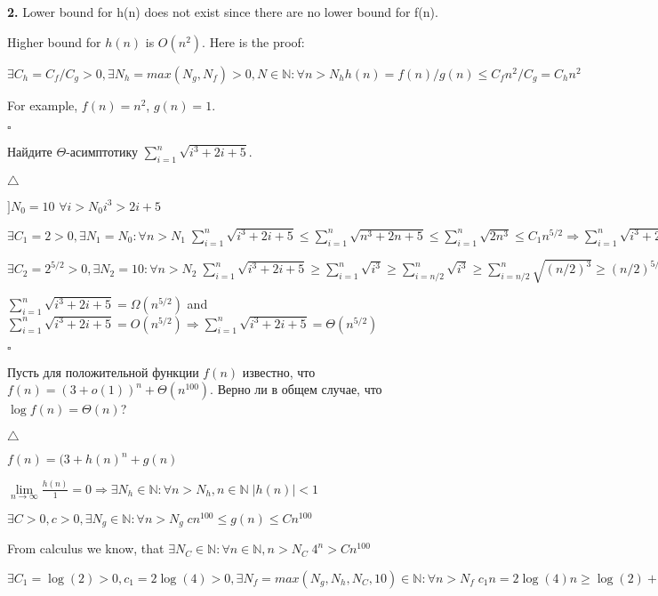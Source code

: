 \documentclass[12pt]{extreport}
\theoremstyle{definiton}
\theoremstyle{definition}
\theoremstyle{definition}
\let\leq\leqslant
\let\geq\geqslant
\newcounter{problem}
\newcounter{subproblem}
\def\beforPRskip{
	\bigskip
}
\def\pr{\beforPRskip\noindent\stepcounter{problem}{\bf \theproblem .\;}\setcounter{subproblem}{0}}
\begin{document}
\textbf{2.} Lower bound for h(n) does not exist since there are no lower bound for f(n).

Higher bound for $ h(n) $ is $ O(n^2) $. Here is the proof:

$ \exists C_h = C_f/C_g > 0, \exists N_h = max (N_g,N_f)>0, N \in \mathbb{N}: \forall n > N_h h(n) = f(n)/g(n) \leq C_fn^2/C_g = C_h n^2$

For example, $f(n) = n^2$, $g(n) = 1$.

\hfill $\square$

\pr Найдите $\Theta$-асимптотику $\sum\limits_{i=1}^n \sqrt{i^3+2i+5}$.

$\triangle$

	$ \big] N_0 = 10 $
	$ \forall i > N_0 i^3>2i+5$
	
	$ \exists C_1 = 2 > 0, \exists N_1 = N_0 : \forall n >N_1 \; \sum_{i=1}^{n} \sqrt{i^3 + 2i +5} \leq \sum_{i=1}^{n} \sqrt{n^3 + 2n +5} \leq \sum_{i=1}^{n} \sqrt{2n^3} \leq C_1 n^{5/2} \Rightarrow \sum_{i=1}^{n} \sqrt{i^3 + 2i +5} = O(n^{5/2})$
	
	
	$ \exists C_2 = 2^{5/2} > 0, \exists N_2 = 10 : \forall n >N_2 \; \sum_{i=1}^{n} \sqrt{i^3 + 2i +5} \geq  \sum_{i=1}^{n} \sqrt{i^3} \geq \sum_{i=n/2}^{n} \sqrt{i^3}  \geq \sum_{i=n/2}^{n} \sqrt{(n/2)^3} \geq (n/2)^{5/2} = C_2 n^{5/2} \Rightarrow \sum_{i=1}^{n} \sqrt{i^3 + 2i +5} = \Omega(n^{5/2}) $
	
	$ \sum_{i=1}^{n} \sqrt{i^3 + 2i +5} =  \Omega(n^{5/2}) $ and $ \sum_{i=1}^{n} \sqrt{i^3 + 2i +5} = O(n^{5/2}) \Rightarrow \sum_{i=1}^{n} \sqrt{i^3 + 2i +5} = \Theta(n^{5/2}) $

\hfill $\square$

\pr Пусть для положительной функции $f(n)$ известно, что $f(n) = (3 + o(1))^n + \Theta(n^{100})$. Верно ли в общем случае, что $\log f(n) = \Theta(n)$?
       
       $\triangle$
       
       $ f(n) = (3 + h(n)^n + g(n)$
       
       $ \lim\limits_{n\rightarrow\infty} \frac{h(n)}{1} = 0 \Rightarrow \exists N_h\in \mathbb{N} : \forall n> N_h, n \in \mathbb{N} \; |h(n)| < 1$
       
       $ \exists C>0,c>0, \exists N_g\in \mathbb{N} : \forall n > N_g \; cn^{100}\leq g(n) \leq Cn^{100}$
       
       From calculus we know, that $ \exists N_C \in \mathbb{N} : \forall n \in \mathbb{N} , n > N_C \; 4^n>Cn^{100}$
       
       $ \exists C_1=\log(2) >0,c_1=2\log(4) >0, \exists N_f = max(N_g, N_h, N_C, 10 )\in \mathbb{N} : \forall n > N_f \;c_1n=2\log(4)n\geq\log(2) + n\log(4)=\log(2*4^n) \geq \log((4)^n + Cn^{100})\geq \log((3+h(n))^n + g(n) \geq \log(2^n + cn^{100}) \geq \log(2^n) = C_1n \Rightarrow f(n)=\Theta(n)$
       
\end{document}
